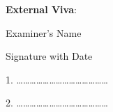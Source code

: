 \documentclass[12pt,a4paper]{report}
\begin{document}
\begin{center}
\large \textbf{External Viva}:
\end{center}
\begin{flushleft}
\begin{normalsize}Examiner's Name \end{normalsize}
\hspace{6.5cm}
\begin{normalsize}Signature with Date\end{normalsize}
\end{flushleft}
\vspace{0.1in}
\begin{flushleft}
1. \ldots\ldots\ldots\ldots\ldots\ldots \ldots \hspace{5.8cm}\ldots\ldots\ldots\ldots \ldots\ldots\ldots
\par
\vspace{0.2in}
2. \ldots\ldots\ldots\ldots\ldots\ldots \ldots \hspace{5.8cm}\ldots\ldots\ldots\ldots \ldots\ldots\ldots
\end{flushleft}
\newpage
\end{document}
